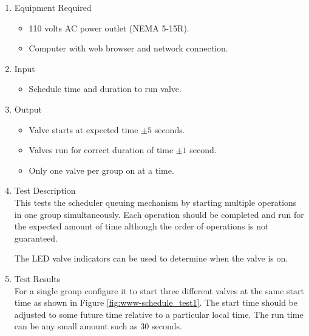 \documentclass{article}
\begin{document}
\begin{enumerate}
\item Equipment Required
	\begin{itemize}
	\item 110 volts AC power outlet (NEMA 5-15R).
	\item Computer with web browser and network connection.
	\end{itemize}
\item Input
	\begin{itemize}
	\item Schedule time and duration to run valve.
	\end{itemize}
\item Output
	\begin{itemize}
	\item Valve starts at expected time $\pm5$ seconds.
	\item Valves run for correct duration of time $\pm1$ second.
	\item Only one valve per group on at a time.
	\end{itemize}

\item Test Description \\

This tests the scheduler queuing mechanism by starting multiple
operations in one group simultaneously.
Each operation should be completed and run for the expected amount
of time although the order of operations is not guaranteed.

The LED valve indicators can be used to determine when the valve is on.

\pagebreak
\item Test Results \\
	\vspace{1em}
	For a single group configure it to start three different valves
	at the same start time as shown in Figure \ref{fig:www-schedule_test1}.
	The start time should be adjusted to some future time relative
	to a particular local time.
	The run time can be any small amount such as 30 seconds. \\


\end{enumerate}
\end{document}
